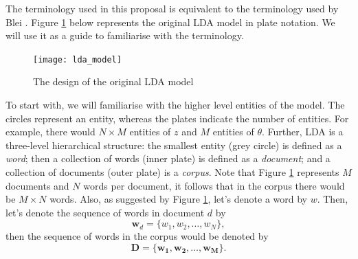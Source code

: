 \documentclass{mprop}
\begin{document}
\par The terminology used in this proposal is equivalent to the terminology used by Blei \cite{blei_2012}. Figure \ref{fig:lda} below represents the original LDA model in plate notation. We will use it as a guide to familiarise with the terminology.   
\begin{figure}[H]
  \centering
  \texttt{[image: lda\_model]}
  \caption{The design of the original LDA model}
  \label{fig:lda}
\end{figure}

\par To start with, we will familiarise with the higher level entities of the model. The circles represent an entity, whereas the plates indicate the number of entities. For example, there would $N \times M$ entities of $z$ and $M$ entities of $\theta$. Further, LDA is a three-level hierarchical structure: the smallest entity (grey circle) is defined as a \textit{word}; then a collection of words (inner plate) is defined as a \textit{document}; and a collection of documents (outer plate) is a \textit{corpus}. Note that Figure \ref{fig:lda} represents $M$ documents and $N$ words per document, it follows that in the corpus there would be $M \times N$ words. Also, as suggested by Figure \ref{fig:lda}, let's denote a word by $w$. Then, let's denote the sequence of words in document $d$ by 
\begin{equation*}
\mathbf{w}_d = \{w_1, w_2, \dots, w_N\},
\end{equation*}
then the sequence of words in the corpus would be denoted by
\begin{equation*}
\mathcal{\mathbf{D}} = \{\mathbf{w_1}, \mathbf{w_2}, \dots, \mathbf{w_M}\}.
\end{equation*}
 
\end{document}
